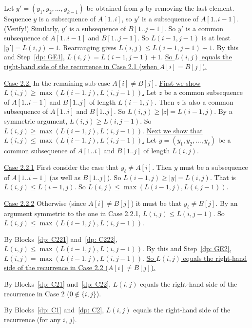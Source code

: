 \begin{longFormProof}
\begin{block}[dp: C2]
\begin{block}[dp: C21]
      \step Let $y'=(y_1, y_2, \ldots, y_{k-1})$ be obtained from $y$ by removing the last element.
      \step Sequence $y$ is a subsequence of $A[1..i]$,
      so $y'$ is a subsequence of $A[1..i-1]$.  (Verify!)
      \step Similarly, $y'$ is a subsequence of $B[1..j-1]$.
      \step So $y'$ is a common subsequence of $A[1..i-1]$ and $B[1..j-1]$.
      \step So $L(i-1, j-1)$ is at least $|y'| = L(i,j) - 1$.
      Rearranging gives $L(i,j) \le L(i-1, j-1) + 1$.
      \smallskip
      \step By this and Step~\ref{dp: GE1}, $L(i,j) = L(i-1, j-1) + 1$.
      \step \underline{So $L(i,j)$ equals the right-hand side of the recurrence
        in Case 2.1 (when $A[i]= B[j]$).}
    \end{block}
    \smallskip
    \begin{block}[dp: C22]
      \step \underline{Case 2.2.}
      In the remaining sub-case $A[i] \ne B[j]$.
      \smallskip
      \step \underline{First we show $L(i, j) \ge \max(L(i-1, j), L(i, j-1))$.}
      \step Let $z$ be a common subsequence
      of $A[1..i-1]$ and $B[1..j]$ of length $L(i-1, j)$.
      \step Then $z$ is also a common subsequence of $A[1..i]$ and $B[1..j]$.
      \step So $L(i, j) \ge |z| = L(i-1, j)$.
      \step[dp: GE2] By a symmetric argument,  $L(i, j) \ge L(i, j-1)$.
      So $L(i,j) \ge \max(L(i-1, j), L(i, j-1))$.
      \smallskip
      \step \underline{Next we show that $L(i, j) \le \max(L(i-1, j), L(i, j-1))$.}
      \step Let $y=(y_1, y_2, \ldots, y_\ell)$ be a common subsequence
      of $A[1..i]$ and $B[1..j]$ of length $L(i,j)$.
      \begin{block}[dp: C221]
        \step \underline{Case 2.2.1} First consider the case that $y_\ell \ne A[i]$.
        \step Then $y$ must be a subsequence of $A[1..i-1]$ (as well as $B[1..j]$).
        \step So $L(i-1, j) \ge |y| = L(i, j)$.  That is $L(i, j) \le L(i-1, j)$.
        \step So $L(i, j) \le \max( L(i-1, j), L(i, j-1))$.
      \end{block}
      \begin{block}[dp: C222]
        \step \underline{Case 2.2.2} Otherwise (since $A[i] \ne B[j]$)
        it must be that $y_\ell \ne B[j]$.
        \step By an argument symmetric to the one in Case 2.2.1, $L(i, j) \le L(i, j-1)$.
        \step So $L(i, j) \le \max( L(i-1, j), L(i, j-1))$.
      \end{block}
      \step By Blocks~\ref{dp: C221} and~\ref{dp: C222},  $L(i, j) \le \max( L(i-1, j), L(i, j-1))$.
      \step By this and Step~\ref{dp: GE2},  $L(i, j) = \max( L(i-1, j), L(i, j-1))$.
      \step \underline{So $L(i,j)$ equals the right-hand side of the recurrence in Case 2.2
        ($A[i] \ne B[j]$).}
    \end{block}
    \step By Blocks~\ref{dp: C21} and~\ref{dp: C22},
    $L(i,j)$ equals the right-hand side of the recurrence in Case 2
    ($0\not\in \{i, j\}$).
  \end{block}
  \step By Blocks~\ref{dp: C1} and~\ref{dp: C2},
  $L(i,j)$ equals the right-hand side of the recurrence (for any $i$, $j$).
\end{longFormProof}

